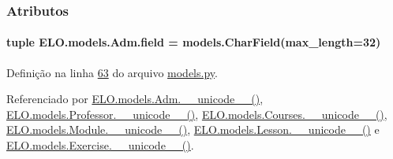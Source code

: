 

\subsubsection{Atributos}
\hypertarget{classELO_1_1models_1_1Adm_ae1af4ca22491b1cfe9cb0a7acefaa71e}{}
\paragraph[{field}]{\setlength{\rightskip}{0pt plus 5cm}tuple E\+L\+O.\+models.\+Adm.\+field = models.\+Char\+Field(max\+\_\+length=32)\hspace{0.3cm}{\ttfamily [static]}}\label{classELO_1_1models_1_1Adm_ae1af4ca22491b1cfe9cb0a7acefaa71e}


Definição na linha \hyperlink{ELO_2models_8py_source_l00063}{63} do arquivo \hyperlink{ELO_2models_8py_source}{models.\+py}.



Referenciado por \hyperlink{classELO_1_1models_1_1Adm_a321eaeaced2b6423fd23ad9d0401808e}{E\+L\+O.\+models.\+Adm.\+\_\+\+\_\+unicode\+\_\+\+\_\+()}, \hyperlink{classELO_1_1models_1_1Professor_a8c0714e4a283c139c0d7aed94a498a7b}{E\+L\+O.\+models.\+Professor.\+\_\+\+\_\+unicode\+\_\+\+\_\+()}, \hyperlink{classELO_1_1models_1_1Courses_a8676cba71b99ab2ba60726b9b5e33825}{E\+L\+O.\+models.\+Courses.\+\_\+\+\_\+unicode\+\_\+\+\_\+()}, \hyperlink{classELO_1_1models_1_1Module_a8fc9fadf09fa7b3bbcfea69ebe25d278}{E\+L\+O.\+models.\+Module.\+\_\+\+\_\+unicode\+\_\+\+\_\+()}, \hyperlink{classELO_1_1models_1_1Lesson_a53e265de97c6b73f262f62a80f9ca994}{E\+L\+O.\+models.\+Lesson.\+\_\+\+\_\+unicode\+\_\+\+\_\+()} e \hyperlink{classELO_1_1models_1_1Exercise_a23f81c66e4d6bc5a4582d74d191f5117}{E\+L\+O.\+models.\+Exercise.\+\_\+\+\_\+unicode\+\_\+\+\_\+()}.

